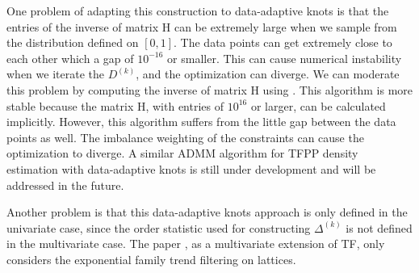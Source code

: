 One problem of adapting this construction to data-adaptive knots is that the entries of the inverse of matrix H can be extremely large when we sample from the distribution defined on $[0,1]$. The data points can get extremely close to each other which a gap of $10^{-16}$ or smaller. This can cause numerical instability when we iterate the $D^{(k)}$, and the optimization can diverge. We can moderate this problem by computing the inverse of matrix H using \citet[Algorithm 2]{wang2014falling}. This algorithm is more stable because the matrix H, with entries of $10^{16}$ or larger, can be calculated implicitly. However, this algorithm suffers from the little gap between the data points as well. The imbalance weighting of the constraints can cause the optimization to diverge. A similar ADMM algorithm for TFPP density estimation with data-adaptive knots is still under development and will be addressed in the future.

Another problem is that this data-adaptive knots approach is only defined in the univariate case, since the order statistic used for constructing $\Delta^{(k)}$ is not defined in the multivariate case. The paper \citet{sadhanala2024exponential}, as a multivariate extension of TF, only considers the exponential family trend filtering on lattices.